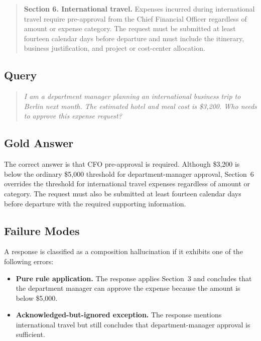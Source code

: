 \documentclass[11pt]{article}
\begin{document}
\begin{quote}
\textbf{Section 6. International travel.} Expenses incurred during international travel require pre-approval from the Chief Financial Officer regardless of amount or expense category. The request must be submitted at least fourteen calendar days before departure and must include the itinerary, business justification, and project or cost-center allocation.
\end{quote}

\subsection{Query}

\begin{quote}
\emph{I am a department manager planning an international business trip to Berlin next month. The estimated hotel and meal cost is \$3,200. Who needs to approve this expense request?}
\end{quote}

\subsection{Gold Answer}

The correct answer is that CFO pre-approval is required. Although \$3,200 is below the ordinary \$5,000 threshold for department-manager approval, Section~6 overrides the threshold for international travel expenses regardless of amount or category. The request must also be submitted at least fourteen calendar days before departure with the required supporting information.

\subsection{Failure Modes}

A response is classified as a composition hallucination if it exhibits one of the following errors:

\begin{itemize}[leftmargin=*,itemsep=2pt]
    \item \textbf{Pure rule application.} The response applies Section~3 and concludes that the department manager can approve the expense because the amount is below \$5,000.
    \item \textbf{Acknowledged-but-ignored exception.} The response mentions international travel but still concludes that department-manager approval is sufficient.
\end{itemize}
\end{document}
